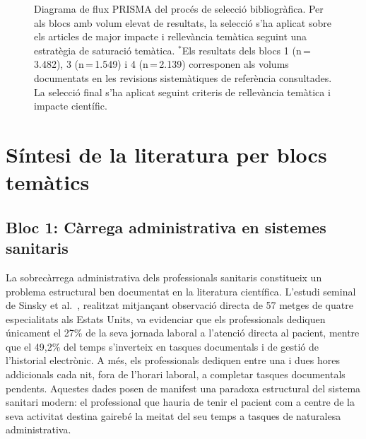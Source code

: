 \documentclass[CAT]{TFUOC}%
\begin{document}
\begin{figure}[H]
\caption{Diagrama de flux PRISMA del procés de selecció bibliogràfica. Per als blocs amb volum elevat de resultats, la selecció s'ha aplicat sobre els articles de major impacte i rellevància temàtica seguint una estratègia de saturació temàtica. $^{*}$Els resultats dels blocs 1 (n\,=\,3.482), 3 (n\,=\,1.549) i 4 (n\,=\,2.139) corresponen als volums documentats en les revisions sistemàtiques de referència consultades. La selecció final s'ha aplicat seguint criteris de rellevància temàtica i impacte científic.}
\label{fig:prisma}
\end{figure}

\section{Síntesi de la literatura per blocs temàtics}

\subsection{Bloc 1: Càrrega administrativa en sistemes sanitaris}

La sobrecàrrega administrativa dels professionals sanitaris constitueix un problema estructural ben documentat en la literatura científica. L'estudi seminal de Sinsky et al.~\cite{sinsky2016allocation}, realitzat mitjançant observació directa de 57 metges de quatre especialitats als Estats Units, va evidenciar que els professionals dediquen únicament el 27\% de la seva jornada laboral a l'atenció directa al pacient, mentre que el 49,2\% del temps s'inverteix en tasques documentals i de gestió de l'historial electrònic. A més, els professionals dediquen entre una i dues hores addicionals cada nit, fora de l'horari laboral, a completar tasques documentals pendents. Aquestes dades posen de manifest una paradoxa estructural del sistema sanitari modern: el professional que hauria de tenir el pacient com a centre de la seva activitat destina gairebé la meitat del seu temps a tasques de naturalesa administrativa.
\end{document}
